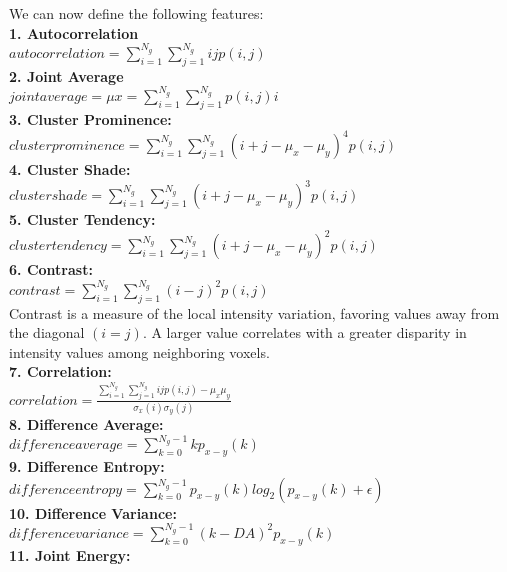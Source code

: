 We can now define the following features: \\
\textbf{1. Autocorrelation}\\
$\textit{autocorrelation}=\sum _{i=1}^{N_{g}}\sum _{j=1}^{N_{g}}ijp\left(i,j\right)$\\
\textbf{2. Joint Average}\\
$\textit{jointaverage}=\mu x=\sum _{i=1}^{N_{g}}\sum _{j=1}^{N_{g}}p\left(i,j\right)i$\\
\textbf{3. Cluster Prominence:}\\
$\textit{clusterprominence}=\sum _{i=1}^{N_{g}}\sum _{j=1}^{N_{g}}\left(i+j-\mu _{x}-\mu _{y}\right)^{4}p\left(i,j\right)$\\
\textbf{4. Cluster Shade:}\\
$\textit{clustershade}=\sum _{i=1}^{N_{g}}\sum _{j=1}^{N_{g}}\left(i+j-\mu _{x}-\mu _{y}\right)^{3}p\left(i,j\right)$\\
\textbf{5. Cluster Tendency:}\\
$\textit{clustertendency}=\sum _{i=1}^{N_{g}}\sum _{j=1}^{N_{g}}\left(i+j-\mu _{x}-\mu _{y}\right)^{2}p\left(i,j\right)$\\
\textbf{6. Contrast:}\\
$\textit{contrast}=\sum _{i=1}^{N_{g}}\sum _{j=1}^{N_{g}}\left(i-j\right)^{2}p\left(i,j\right)$\\
Contrast is a measure of the local intensity variation, favoring values away from the diagonal $\left(i=j\right)$. A larger value correlates with a greater disparity in intensity values among neighboring voxels.\\
\textbf{7. Correlation:}\\
$\textit{correlation}=\frac{\sum _{i=1}^{N_{g}}\sum _{j=1}^{N_{g}}ijp\left(i,j\right)-\mu _{x}\mu _{y}}{\sigma _{x}\left(i\right)\sigma _{y}\left(j\right)}$\\
\textbf{8. Difference Average:}\\
$\textit{differenceaverage}=\sum _{k=0}^{N_{g}-1}kp_{x-y}\left(k\right)$\\
\textbf{9. Difference Entropy:}\\
$\textit{differenceentropy}=\sum _{k=0}^{N_{g}-1}p_{x-y}\left(k\right)log_{2}\left(p_{x-y}\left(k\right)+\epsilon \right)$\\
\textbf{10. Difference Variance:}\\
$\textit{differencevariance}=\sum _{k=0}^{N_{g}-1}{\left(k-DA\right)^{2}}p_{x-y}\left(k\right)$\\
\textbf{11. Joint Energy:}\\
